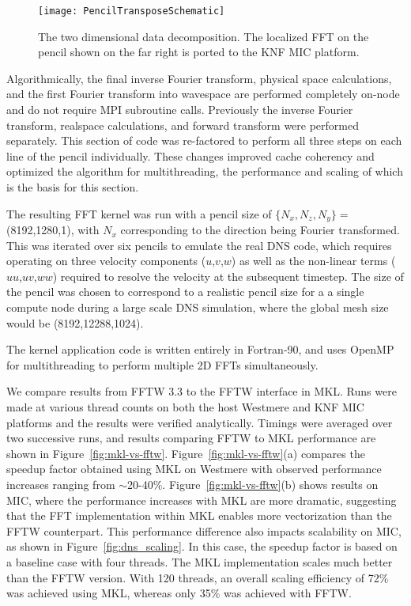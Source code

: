 \begin{figure}[htb]
 \begin{center}
  \texttt{[image: PencilTransposeSchematic]}
  \caption{The two dimensional data decomposition. The localized FFT
    on the pencil shown on the far right is ported to the KNF MIC platform.}
    \label{fig:pencil2}
 \end{center}
\end{figure}

Algorithmically, the final inverse Fourier transform, physical space
calculations, and the first Fourier transform into wavespace are
performed completely on-node and do not require MPI subroutine calls. 
Previously the inverse Fourier transform, realspace calculations,
and forward transform were performed separately. This section of code
was re-factored to perform all three steps on each line of the pencil
individually. These changes improved cache coherency and optimized the
algorithm for multithreading, the performance and scaling of which is
the basis for this section. 

The resulting FFT kernel was run with a pencil size of $\{N_x,N_z, N_y\} =$ 
(8192,1280,1), with $N_x$ corresponding to the direction being
Fourier transformed. This was iterated over six pencils to emulate
the real DNS code, which requires operating on three velocity components
($u$,$v$,$w$) as well as the non-linear terms ($uu$,$uv$,$ww$) required
to resolve the velocity at the subsequent timestep. The size of the
pencil was chosen to correspond to a realistic pencil size for a a
single compute node during a large scale DNS simulation, where the
global mesh size would be (8192,12288,1024). 

The kernel application code is written entirely in Fortran-90, and
uses OpenMP for multithreading to perform multiple 2D
FFTs simultaneously.

We compare results from FFTW 3.3 to the FFTW interface in MKL.  Runs
were made at various thread counts on both the host Westmere and KNF
MIC platforms and the results were verified analytically. Timings were
averaged over two successive runs, and results comparing FFTW to MKL
performance are shown in
Figure~\ref{fig:mkl-vs-fftw}. Figure~\ref{fig:mkl-vs-fftw}(a) compares
the speedup factor obtained using MKL on Westmere with observed
performance increases ranging from $\sim$20-40\%.
Figure~\ref{fig:mkl-vs-fftw}(b) shows results on MIC, where the
performance increases with MKL are more dramatic, suggesting that the
FFT implementation within MKL enables more vectorization than the FFTW
counterpart. This performance difference also impacts scalability on
MIC, as shown in Figure~\ref{fig:dns_scaling}.  In this case, the
speedup factor is based on a baseline case with four threads.  The MKL
implementation scales much better than the FFTW version. With 120
threads, an overall scaling efficiency of 72\% was achieved using MKL,
whereas only 35\% was achieved with FFTW.


